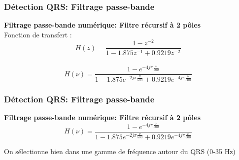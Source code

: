 \documentclass{beamer}
\begin{document}
\begin{frame}
\frametitle{Détection QRS: Filtrage passe-bande}
 \textbf{Filtrage passe-bande numérique: Filtre récursif à  2 pôles}\\

  \vspace{0.3 cm}
  Fonction de transfert :
   \[H(z) = \frac{1 - z^{-2}}{1 - 1.875 z^{-1} + 0.9219 z^{-2}} \]  \\
  \vspace{0.3cm}
   \[H(\nu) = \frac{1 - e^{-4 j \pi \frac{\nu}{500}}}{1 - 1.875 e^{-2 j \pi \frac{\nu}{500}} + 0.9219  e^{-4 j \pi \frac{\nu}{500}}} \] 

\end{frame}

\begin{frame}
\frametitle{Détection QRS: Filtrage passe-bande}
 \textbf{Filtrage passe-bande numérique: Filtre récursif à  2 pôles}\\
\[H(\nu) = \frac{1 - e^{-4 j \pi \frac{\nu}{500}}}{1 - 1.875 e^{-2 j \pi \frac{\nu}{500}} + 0.9219  e^{-4 j \pi \frac{\nu}{500}}} \] 
\begin{center}
\end{center}
\vspace{0.3cm}
On sélectionne bien dans une gamme de fréquence autour du QRS (0-35 Hz)
\end{frame}
\end{document}
